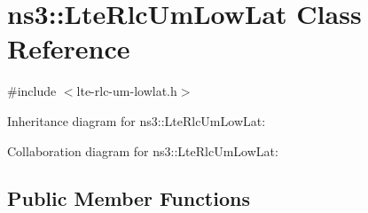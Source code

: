 \hypertarget{classns3_1_1LteRlcUmLowLat}{}\section{ns3\+:\+:Lte\+Rlc\+Um\+Low\+Lat Class Reference}
\label{classns3_1_1LteRlcUmLowLat}


{\ttfamily \#include $<$lte-\/rlc-\/um-\/lowlat.\+h$>$}



Inheritance diagram for ns3\+:\+:Lte\+Rlc\+Um\+Low\+Lat\+:


Collaboration diagram for ns3\+:\+:Lte\+Rlc\+Um\+Low\+Lat\+:
\subsection*{Public Member Functions}
